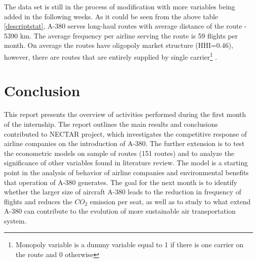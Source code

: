 \documentclass[titlepage, 11pt]{article}
\begin{document}
\tab The data set is still in the process of modification with more variables being added in the following weeks. As it could be seen from the above table \ref{descriptstat}, A-380 serves long-haul routes with average distance of the route - 5390 km. The average frequency per airline serving the route is 59 flights per month. On average the routes have oligopoly market structure (HHI=0.46), however, there are routes that are entirely supplied by single carrier\footnote{Monopoly variable is a dummy variable equal to 1 if there is one carrier on the route and 0 otherwise} . 


\section{Conclusion}\label{conclusion}
\tab This report presents the overview of activities performed during the first month of the internship. The report outlines the main results and conclusions contributed to NECTAR project, which investigates the competitive response of airline companies on the introduction of A-380. The further extension is to test the econometric models on sample of routes (151 routes) and to analyze the significance of other variables found in literature review. The model is a starting point in the analysis of behavior of airline companies and environmental benefits that operation of A-380 generates. The goal for the next month is to identify whether the larger size of aircraft A-380 leads to the reduction in frequency of flights and reduces the $CO_2$ emission per seat, as well as to study to what extend A-380 can contribute to the evolution of more sustainable air transportation system. 
 
\end{document}
